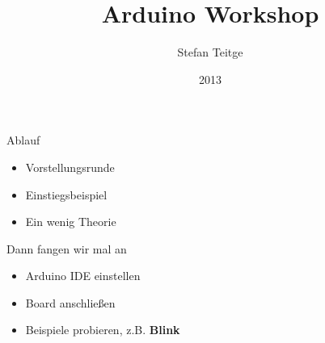 \documentclass{beamer}
\title[Arduino Workshop]{Arduino Workshop}
\author[S. Teitge]{Stefan Teitge}
\institute[EBK]{
  Eigenbaukombinat Halle e.V.
}
\date[2013]{2013}
\begin{document}
\begin{frame}[plain]
  \titlepage
\end{frame}

\begin{frame}{Ablauf}

\begin{itemize}
  \item Vorstellungsrunde
  \item Einstiegsbeispiel
  \item Ein wenig Theorie
\end{itemize}

\end{frame}

\begin{frame}{Dann fangen wir mal an}

\begin{itemize}
  \item Arduino IDE einstellen
  \item Board anschließen
  \item Beispiele probieren, z.B. \textbf{Blink}
\end{itemize}

\end{frame}
\end{document}
